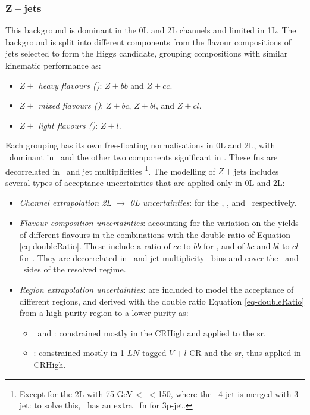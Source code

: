 \subsubsection{$\boldsymbol{Z+}$jets}
This background is dominant in the 0L and 2L channels and limited in 1L. The background is split into different components from the flavour compositions of jets selected to form the Higgs candidate, grouping compositions with similar kinematic performance as:   
\begin{itemize}
    \item \textit{$Z+$ heavy flavours (\zhf)}: $Z+bb$ and $Z+cc$.
    \item \textit{$Z+$ mixed flavours (\zmf)}: $Z+bc$, $Z+bl$, and $Z+cl$.
    \item \textit{$Z+$ light flavours (\zlf)}: $Z+l$.
\end{itemize}
Each grouping has its own free-floating normalisations in 0L and 2L, with \zhf\ dominant in \vhb\ and the other two components significant in \vhc. These \glspl{fn} are decorrelated in \ptv\ and jet multiplicities \nj\footnote{Except for the 2L with 75 GeV < \ptv\ < 150, where the \vhb\ 4-jet is merged with 3-jet: to solve this, \vhb\ has an extra \zhf\ \gls{fn} for 3p-jet.}. The modelling of $Z+$jets includes several types of acceptance uncertainties that are applied only in 0L and 2L:
\begin{itemize}[leftmargin=*]
    \item \textit{Channel extrapolation 2L $\rightarrow$ 0L uncertainties}: for the \zhf, \zmf, and \zlf\ respectively. 
    \item \textit{Flavour composition uncertainties}: accounting for the variation on the yields of different flavours in the combinations with the double ratio of Equation \ref{eq-doubleRatio}. These include a ratio of $cc$ to $bb$ for \zhf, and of $bc$ and $bl$ to $cl$ for \zmf. They are decorrelated in \ptv\ and jet multiplicity \nj\ bins and cover the \vhb\ and \vhc\ sides of the resolved regime. 
    \item \textit{Region extrapolation uncertainties}: are included to model the acceptance of different regions, and derived with the double ratio Equation \ref{eq-doubleRatio} from a high purity region to a lower purity as:
    \begin{itemize}
        \item \zhf\ and \zmf: constrained mostly in the CRHigh and applied to the \gls{sr}. 
        \item \zlf: constrained mostly in 1 $LN$-tagged $V+l$ CR and the \gls{sr}, thus applied in CRHigh. %
    \end{itemize}
\end{itemize}

